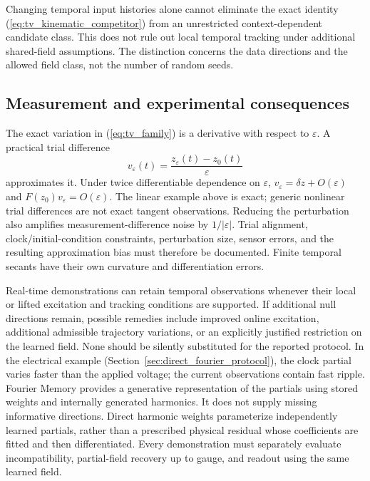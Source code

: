 Changing temporal input histories alone cannot eliminate the exact identity
(\ref{eq:tv_kinematic_competitor}) from an unrestricted context-dependent
candidate class. This does not rule out local temporal tracking under
additional shared-field assumptions. The distinction concerns the data
directions and the allowed field class, not the number of random seeds.

\subsection{Measurement and experimental consequences}
The exact variation in (\ref{eq:tv_family}) is a derivative with respect to
$\varepsilon$. A practical trial difference
\begin{equation}
 v_\varepsilon(t)=
       \frac{z_\varepsilon(t)-z_0(t)}{\varepsilon}
 \label{eq:tv_finite_trial}
\end{equation}
approximates it. Under twice differentiable dependence on $\varepsilon$,
$v_\varepsilon=\delta z+O(\varepsilon)$ and
$F(z_0)v_\varepsilon=O(\varepsilon)$. The linear example above is exact;
generic nonlinear trial differences are not exact tangent observations.
Reducing the perturbation also amplifies measurement-difference noise by
$1/|\varepsilon|$. Trial alignment, clock/initial-condition constraints,
perturbation size, sensor errors, and the resulting approximation bias must
therefore be documented. Finite temporal secants have their own curvature
and differentiation errors.

Real-time demonstrations can retain temporal observations whenever their
local or lifted excitation and tracking conditions are supported. If
additional null directions remain, possible remedies include improved
online excitation, additional admissible trajectory variations, or an
explicitly justified restriction on the learned field. None should be
silently substituted for the reported protocol. In the electrical example
(Section~\ref{sec:direct_fourier_protocol}), the clock partial varies faster
than the applied voltage; the current observations contain fast ripple.
Fourier Memory provides a generative representation of the partials using
stored weights and internally generated harmonics. It does not supply
missing informative directions. Direct harmonic weights
parameterize independently learned partials, rather than a prescribed
physical residual whose coefficients are fitted and then differentiated.
Every demonstration must separately evaluate incompatibility, partial-field
recovery up to gauge, and readout using the same learned field.
